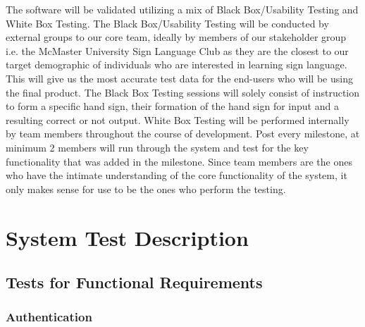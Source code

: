 \documentclass[12pt, titlepage]{article}
\begin{document}
The software will be validated utilizing a mix of Black Box/Usability Testing and White Box Testing. The Black Box/Usability Testing will be conducted by external groups to our core team, ideally by members of our stakeholder group i.e. the McMaster University Sign Language Club as they are the closest to our target demographic of individuals who are interested in learning sign language. This will give us the most accurate test data for the end-users who will be using the final product. The Black Box Testing sessions will solely consist of instruction to form a specific hand sign, their formation of the hand sign for input and a resulting correct or not output. \newline 
\indent White Box Testing will be performed internally by team members throughout the course of development. Post every milestone, at minimum 2 members will run through the system and test for the key functionality that was added in the milestone. Since team members are the ones who have the intimate understanding of the core functionality of the system, it only makes sense for use to be the ones who perform the testing.

\section{System Test Description}
	
\subsection{Tests for Functional Requirements}

\subsubsection{Authentication}
		
\end{document}
